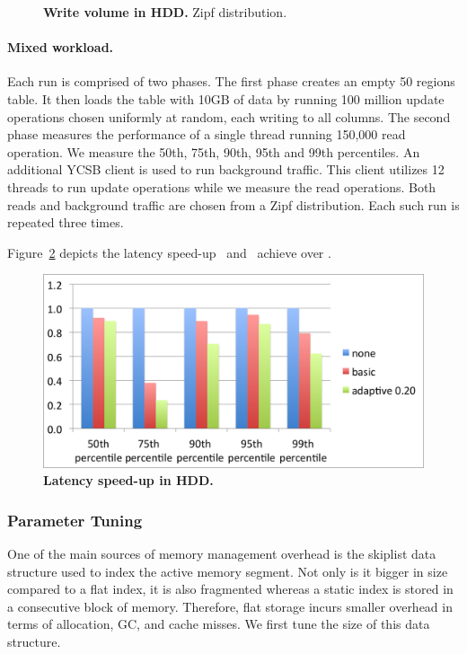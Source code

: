 {\begin{figure}[htb]
\caption{{\bf  Write volume in HDD.} Zipf distribution.
}
\label{fig:volume-hdd-uniform}
\end{figure}



\paragraph{Mixed workload.}
Each run is comprised of two phases. 
The first phase creates an empty 50 regions table. It then loads the table with 10GB of data by running 100 million update operations chosen uniformly at random, each writing to all columns. 
The second phase measures the performance of a single thread running 150,000 read operation. 
We measure the 50th, 75th, 90th, 95th and 99th percentiles.
An additional YCSB client is used to run background traffic. 
This client utilizes 12 threads to run update operations while we measure the read operations. 
Both reads and background traffic are chosen from a Zipf distribution.
Each such run is repeated three times. 

Figure~\ref{fig:latency-speedup-hdd} depicts the latency speed-up \basic\ and \magic\ achieve over \none.

\begin{figure}[htb]
\includegraphics[width=\figw]{Figs/latency-speedup-hdd.png}
\caption{{\bf Latency speed-up in HDD.} 
}
\label{fig:latency-speedup-hdd}
\end{figure}
}

\subsubsection{Parameter Tuning} \label{ssec:tuning}
One of the main sources of memory management overhead is the skiplist data structure used to index the active  memory segment.
Not only  is it bigger in size compared to a flat index, it is also fragmented whereas a static index is stored in a consecutive block of memory. Therefore, flat storage incurs smaller overhead in terms of allocation, GC, and cache misses.
We first tune the size of this data structure.

